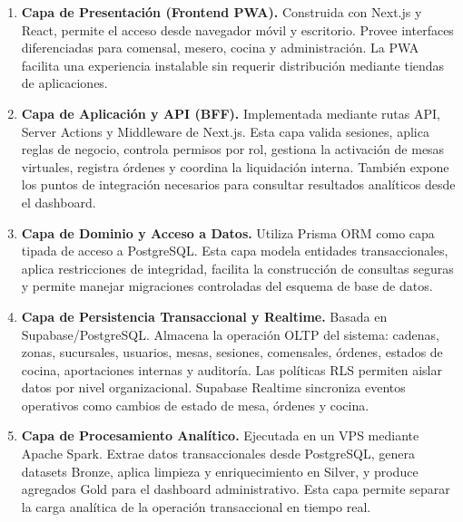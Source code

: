 \begin{enumerate}[leftmargin=1.5em]
    \item \textbf{Capa de Presentación (Frontend PWA).}
    Construida con Next.js y React, permite el acceso desde navegador móvil y
    escritorio. Provee interfaces diferenciadas para comensal, mesero, cocina y
    administración. La PWA facilita una experiencia instalable sin requerir
    distribución mediante tiendas de aplicaciones.

    \item \textbf{Capa de Aplicación y API (BFF).}
    Implementada mediante rutas API, Server Actions y Middleware de Next.js. Esta
    capa valida sesiones, aplica reglas de negocio, controla permisos por rol,
    gestiona la activación de mesas virtuales, registra órdenes y coordina la
    liquidación interna. También expone los puntos de integración necesarios para
    consultar resultados analíticos desde el dashboard.

    \item \textbf{Capa de Dominio y Acceso a Datos.}
    Utiliza Prisma ORM como capa tipada de acceso a PostgreSQL. Esta capa modela
    entidades transaccionales, aplica restricciones de integridad, facilita la
    construcción de consultas seguras y permite manejar migraciones controladas
    del esquema de base de datos.

    \item \textbf{Capa de Persistencia Transaccional y Realtime.}
    Basada en Supabase/PostgreSQL. Almacena la operación OLTP del sistema: cadenas,
    zonas, sucursales, usuarios, mesas, sesiones, comensales, órdenes, estados de
    cocina, aportaciones internas y auditoría. Las políticas RLS permiten aislar datos
    por nivel organizacional. Supabase Realtime sincroniza eventos operativos como
    cambios de estado de mesa, órdenes y cocina.

    \item \textbf{Capa de Procesamiento Analítico.}
    Ejecutada en un VPS mediante Apache Spark. Extrae datos transaccionales desde
    PostgreSQL, genera datasets Bronze, aplica limpieza y enriquecimiento en Silver,
    y produce agregados Gold para el dashboard administrativo. Esta capa permite
    separar la carga analítica de la operación transaccional en tiempo real.
\end{enumerate}

